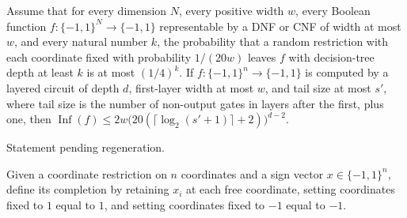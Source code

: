 \begin{theorem}
\label{FABL.DepthCircuit.exercise4_20_of_quarterSwitching}
\leanok
{}
Assume that for every dimension $N$, every positive width $w$, every Boolean function
$f:\{−1,1\}^N\to\{−1,1\}$ representable by a DNF or CNF of width at most $w$, and every
natural number $k$, the probability that a random restriction with each coordinate fixed
with probability $1/(20w)$ leaves $f$ with decision-tree depth at least $k$ is at most
$(1/4)^k$. If $f:\{−1,1\}^n\to\{−1,1\}$ is computed by a layered circuit of depth $d$,
first-layer width at most $w$, and tail size at most $s'$, where tail size is the number
of non-output gates in layers after the first, plus one, then $\operatorname{Inf}(f)\le
2w\bigl(20(\lceil\log_2(s'+1)\rceil+2)\bigr)^{d-2}$.
\end{theorem}

\begin{theorem}
\label{FABL.hastadQuarterSwitchingBound}
\leanok
{}
Statement pending regeneration.
\end{theorem}

\begin{definition}
\label{FABL.CoordRestriction.completeSign}
\leanok
{}
Given a coordinate restriction on $n$ coordinates and a sign vector $x\in\{-1,1\}^n$,
define its completion by retaining $x_i$ at each free coordinate, setting coordinates
fixed to $1$ equal to $1$, and setting coordinates fixed to $-1$ equal to $-1$.
\end{definition}

